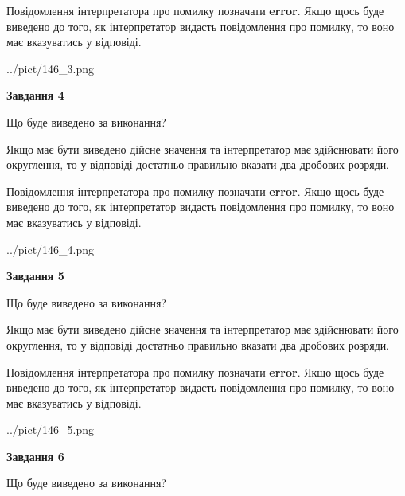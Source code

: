 \documentclass[12pt, ukrainian]{article}
\begin{document}
{\begin {Large}
Повідомлення інтерпретатора про помилку позначати \textbf{error}.
Якщо щось буде виведено до того, як інтерпретатор видасть повідомлення про помилку, 
то воно має вказуватись у відповіді. \par

\begin{center}
	{../pict/146_3.png}
\end{center}
\newpage

{\begin {center}\textbf{Завдання 4}\end {center}}\par
Що буде виведено за виконання? \par

Якщо має бути виведено дійсне значення та інтерпретатор має здійснювати його округлення, 
то у відповіді достатньо правильно вказати два дробових розряди.

Повідомлення інтерпретатора про помилку позначати \textbf{error}.
Якщо щось буде виведено до того, як інтерпретатор видасть повідомлення про помилку, 
то воно має вказуватись у відповіді. \par

\begin{center}
	{../pict/146_4.png}
\end{center}
\newpage

{\begin {center}\textbf{Завдання 5}\end {center}}\par
Що буде виведено за виконання? \par

Якщо має бути виведено дійсне значення та інтерпретатор має здійснювати його округлення, 
то у відповіді достатньо правильно вказати два дробових розряди.

Повідомлення інтерпретатора про помилку позначати \textbf{error}.
Якщо щось буде виведено до того, як інтерпретатор видасть повідомлення про помилку, 
то воно має вказуватись у відповіді. \par

\begin{center}
	{../pict/146_5.png}
\end{center}
\newpage

{\begin {center}\textbf{Завдання 6}\end {center}}\par
Що буде виведено за виконання? \par


\end{Large}}
\end{document}
